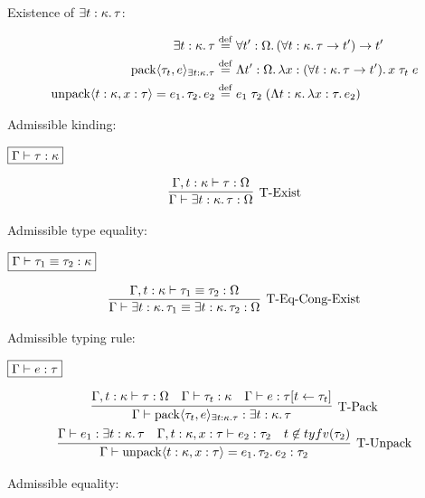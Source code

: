 Existence of $\exists t: \kappa\ldotp\tau$:

\begin{align*}
  \exists t: \kappa\ldotp \tau &\mathrel{\overset{\mathrm{def}}{=}} \forall t': \Omega\ldotp (\forall t: \kappa\ldotp \tau \to t') \to t' \\
  \mathop{\mathrm{pack}}\langle \tau_t, e\rangle_{\exists t: \kappa\ldotp \tau} &\mathrel{\overset{\mathrm{def}}{=}} \Lambda t': \Omega\ldotp \lambda x: (\forall t: \kappa\ldotp \tau \to t')\ldotp x\; \tau_t\; e \\
  \mathop{\mathrm{unpack}}\langle t: \kappa, x: \tau\rangle = e_1\ldotp \tau_2\ldotp e_2 &\mathrel{\overset{\mathrm{def}}{=}} e_1\; \tau_2\; (\Lambda t: \kappa\ldotp \lambda x: \tau\ldotp e_2)
\end{align*}

Admissible kinding:

$\fbox{$\Gamma \vdash \tau: \kappa$}$

\begin{gather*}
  \infer[\text{T-Exist}]{\Gamma \vdash \exists t: \kappa\ldotp \tau: \Omega}{
    \Gamma, t: \kappa \vdash \tau: \Omega
  }
\end{gather*}

Admissible type equality:

$\fbox{$\Gamma \vdash \tau_1 \equiv \tau_2: \kappa$}$

\begin{gather*}
  \infer[\text{T-Eq-Cong-Exist}]{\Gamma \vdash \exists t: \kappa\ldotp \tau_1 \equiv \exists t: \kappa\ldotp \tau_2: \Omega}{
    \Gamma, t: \kappa \vdash \tau_1 \equiv \tau_2: \Omega
  }
\end{gather*}

Admissible typing rule:

$\fbox{$\Gamma \vdash e: \tau$}$

\begin{gather*}
  \infer[\text{T-Pack}]{\Gamma \vdash \sympack\langle \tau_t, e\rangle_{\exists t: \kappa\ldotp \tau}: \exists t: \kappa\ldotp \tau}{
    \Gamma, t: \kappa \vdash \tau: \Omega
    &
    \Gamma \vdash \tau_t: \kappa
    &
    \Gamma \vdash e: \tau[t \assign \tau_t]
  }
  \\
  \infer[\text{T-Unpack}]{\Gamma \vdash \symunpack\langle t: \kappa, x: \tau\rangle = e_1\ldotp \tau_2\ldotp e_2: \tau_2}{
    \Gamma \vdash e_1: \exists t: \kappa\ldotp \tau
    &
    \Gamma, t: \kappa, x: \tau \vdash e_2: \tau_2
    &
    t \not\in \typefreevar(\tau_2)
  }
\end{gather*}

Admissible equality:

